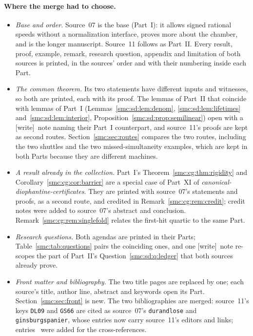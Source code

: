 \documentclass[11pt,letterpaper]{article}
\numberwithin{equation}{section}
\theoremstyle{definition}
\theoremstyle{remark}
\newcommand{\wtag}{\textup{[write]}}
\begin{document}
\paragraph{Where the merge had to choose.}
\begin{itemize}
\item \emph{Base and order.} Source~07 is the base (Part~I): it allows signed rational speeds without a normalization interface, proves more about the chamber, and is the longer manuscript. Source~11 follows as Part~II. Every result, proof, example, remark, research question, appendix and limitation of both sources is printed, in the sources' order and with their numbering inside each Part.
\item \emph{The common theorem.} Its two statements have different inputs and witnesses, so both are printed, each with its proof. The lemmas of Part~II that coincide with lemmas of Part~I (Lemmas~\ref{smc:sd:lem:denom}, \ref{smc:sd:lem:lifetimes} and~\ref{smc:sd:lem:interior}, Proposition~\ref{smc:sd:prop:semilinear}) open with a \wtag\ note naming their Part~I counterpart, and source~11's proofs are kept as second routes. Section~\ref{smc:sec:routes} compares the two routes, including the two shuttles and the two missed-simultaneity examples, which are kept in both Parts because they are different machines.
\item \emph{A result already in the collection.} Part~I's Theorem~\ref{smc:cg:thm:rigidity} and Corollary~\ref{smc:cg:cor:barrier} are a special case of Part~XI of \emph{canonical-diophantine-certificates}. They are printed with source~07's statements and proofs, as a second route, and credited in Remark~\ref{smc:cg:rem:credit}; credit notes were added to source~07's abstract and conclusion. Remark~\ref{smc:cg:rem:singlefold} relates the first-hit quartic to the same Part.
\item \emph{Research questions.} Both agendas are printed in their Parts; Table~\ref{smc:tab:questions} pairs the coinciding ones, and one \wtag\ note re-scopes the part of Part~II's Question~\ref{smc:sd:q:ledger} that both sources already prove.
\item \emph{Front matter and bibliography.} The two title pages are replaced by one; each source's title, author line, abstract and keywords open its Part. Section~\ref{smc:sec:front} is new. The two bibliographies are merged: source~11's keys \texttt{DL09} and \texttt{GS66} are cited as source~07's \texttt{durandlose} and \texttt{ginsburgspanier}, whose entries now carry source~11's editors and links; entries~\cite{cdc,lbh,review808,reviewsignal,blockca} were added for the cross-references.

\end{itemize}
\end{document}
